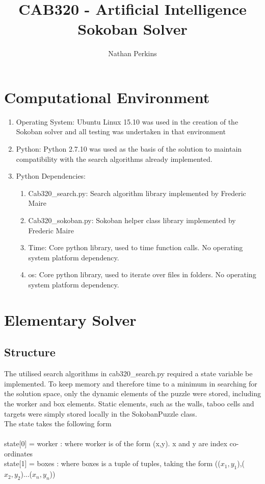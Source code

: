 \documentclass[]{article}
\title{CAB320 - Artificial Intelligence\\
	Sokoban Solver}
\author{Nathan Perkins}
\begin{document}
\maketitle
\newpage
\section{Computational Environment}
\begin{enumerate}
	\item Operating System: Ubuntu Linux 15.10 was used in the creation of the Sokoban solver and all testing was undertaken in that environment
	\item Python: Python 2.7.10 was used as the basis of the solution to maintain compatibility with the search algorithms already implemented.
	\item Python Dependencies: 
	\begin{enumerate}
		\item Cab320\_search.py: Search algorithm library implemented by Frederic Maire
		\item Cab320\_sokoban.py: Sokoban helper class library implemented by Frederic Maire
		\item Time: Core python library, used to time function calls. No operating system platform dependency.
		\item os: Core python library, used to iterate over files in folders. No operating system platform dependency.
	\end{enumerate}
\end{enumerate}
\section{Elementary Solver}
\subsection{Structure}
The utilised search algorithms in cab320\_search.py required a state variable be implemented. To keep memory and therefore time to a minimum in searching for the solution space, only the dynamic elements of the puzzle were stored, including the worker and box elements. Static elements, such as the walls, taboo cells and targets were simply stored locally in the SokobanPuzzle class.\\
The state takes the following form\\
\\state[0] = worker : where worker is of the form (x,y). x and y are index co-ordinates
\\state[1] = boxes : where boxes is a tuple of tuples, taking the form (($x_1,y_1$),($x_2,y_2$)...($x_n,y_n$))
 
\end{document}
